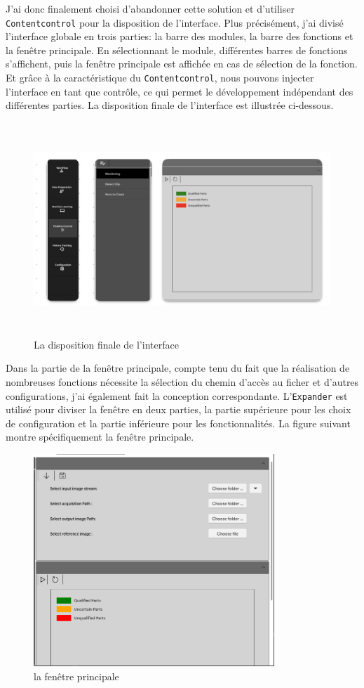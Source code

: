 J'ai donc finalement choisi d'abandonner cette solution et d'utiliser 
\texttt{Contentcontrol} pour la disposition de l'interface. Plus précisément, j'ai divisé l'interface globale en trois parties: la barre des modules, la barre des fonctions et la fenêtre principale. En sélectionnant le module, différentes barres de fonctions s'affichent, puis la fenêtre principale est affichée en cas de sélection de la fonction. Et grâce à la caractéristique du \texttt{Contentcontrol}, nous pouvons injecter l'interface en tant que contrôle, ce qui permet le développement indépendant des différentes parties. La disposition finale de l'interface est illustrée ci-dessous.
\begin{figure}[H]
    \centering
    \includegraphics[height=8cm]{ressources/images/PowerEye_Disposition.jpg}
    \caption{ La disposition finale de l’interface}
\end{figure}

Dans la partie de la fenêtre principale, compte tenu du fait que la réalisation de nombreuses fonctions nécessite la sélection du chemin d'accès au ficher et d'autres configurations, j'ai également fait la conception correspondante. L'\texttt{Expander} est utilisé pour diviser la fenêtre en deux parties, la partie supérieure pour les choix de configuration et la partie inférieure pour les fonctionnalités. La figure suivant montre spécifiquement la fenêtre principale. 
\begin{figure}[H]
    \centering
    \includegraphics[height=8cm]{ressources/images/fenetre_disposition.png}
    \caption{la fenêtre principale}
\end{figure}


